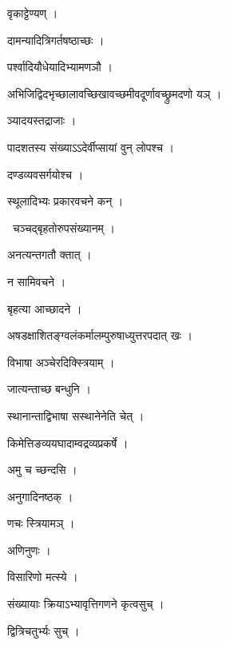 \documentclass[10pt, openany, oneside]{book}
\begin{document}
\noindent वृकाट्टेण्यण् ।

\noindent दामन्यादित्रिगर्तषष्ठाच्छः ।

\noindent पर्श्वादियौधेयादिभ्यामणञौ ।

\noindent अभिजिद्विदभृच्छालावच्छिखावच्छमीवदूर्णावच्छ्रुमदणो यञ् ।

\noindent ञ्यादयस्तद्राजाः ।

\noindent पादशतस्य संख्याऽऽदेर्वीप्सायां वुन् लोपश्च ।

\noindent दण्डव्यवसर्गयोश्च ।

\noindent स्थूलादिभ्यः प्रकारवचने कन् ।

\par\noindent\hspace{1.5em}{\vps वा॰}~{\qt चञ्चद्बृहतोरुपसंख्यानम् ।}

\noindent अनत्यन्तगतौ क्तात् ।

\noindent न सामिवचने ।

\noindent बृहत्या आच्छादने ।

\noindent अषडक्षाशितङ्ग्वलंकर्मालम्पुरुषाध्युत्तरपदात् खः ।

\noindent विभाषा अञ्चेरदिक्स्त्रियाम् ।

\noindent जात्यन्ताच्छ बन्धुनि ।

\noindent स्थानान्ताद्विभाषा सस्थानेनेति चेत् ।

\noindent किमेत्तिङव्ययघादाम्वद्रव्यप्रकर्षे ।

\noindent अमु च च्छन्दसि ।

\noindent अनुगादिनष्ठक् ।

\noindent णचः स्त्रियामञ् ।

\noindent अणिनुणः ।

\noindent विसारिणो मत्स्ये ।

\noindent संख्यायाः क्रियाऽभ्यावृत्तिगणने कृत्वसुच् ।

\noindent द्वित्रिचतुर्भ्यः सुच् ।
\end{document}
